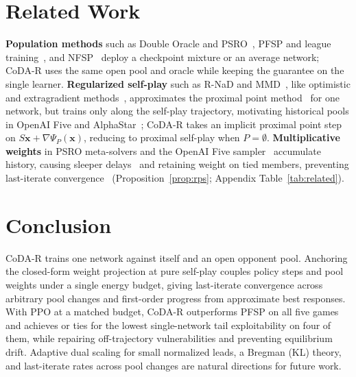 \documentclass{article} %
\theoremstyle{plain}
\theoremstyle{remark}
\newcommand{\bx}{{\bm{x}}}
\newcommand{\codar}{CoDA-R}
\begin{document}
\section{Related Work}
\label{sec:related}

\textbf{Population methods} such as Double Oracle and PSRO~\citep{mcmahan2003doubleoracle,lanctot2017psro,muller2020generalized,mcaleer2020pipeline,wellman2006egta}, PFSP and league training~\citep{vinyals2019alphastar}, and NFSP~\citep{heinrich2015fsp,heinrich2016nfsp} deploy a checkpoint mixture or an average network; \codar{} uses the same open pool and oracle while keeping the guarantee on the single learner. \textbf{Regularized self-play} such as R-NaD and MMD~\citep{perolat2021rnad,perolat2022stratego,sokota2023mmd}, like optimistic and extragradient methods~\citep{daskalakis2018optimism,mertikopoulos2019omd,nemirovski2004prox,cen2021extragradient}, approximates the proximal point method~\citep{rockafellar1976ppa,mokhtari2020ppa} for one network, but trains only along the self-play trajectory, motivating historical pools in OpenAI Five and AlphaStar~\citep{openai2019dota,vinyals2019alphastar}; \codar{} takes an implicit proximal point step on $S\bx+\nabla\Psi_P(\bx)$, reducing to proximal self-play when $P=\emptyset$. \textbf{Multiplicative weights} in PSRO meta-solvers and the OpenAI Five sampler~\citep{lanctot2017psro,mcaleer2022anytime,dinh2022odo,openai2019dota,freund1999hedge} accumulate history, causing sleeper delays~\citep{herbster1998tracking} and retaining weight on tied members, preventing last-iterate convergence~\citep{bailey2018mwu} (Proposition~\ref{prop:rps}; Appendix Table~\ref{tab:related}).

\section{Conclusion}

\codar{} trains one network against itself and an open opponent pool. Anchoring the closed-form weight projection at pure self-play couples policy steps and pool weights under a single energy budget, giving last-iterate convergence across arbitrary pool changes and first-order progress from approximate best responses. With PPO at a matched budget, \codar{} outperforms PFSP on all five games and achieves or ties for the lowest single-network tail exploitability on four of them, while repairing off-trajectory vulnerabilities and preventing equilibrium drift. Adaptive dual scaling for small normalized leads, a Bregman (KL) theory, and last-iterate rates across pool changes are natural directions for future work.
\end{document}
